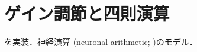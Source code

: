 \section{ゲイン調節と四則演算}\cite{Goldwyn2018-ug}を実装．神経演算 (neuronal arithmetic; \cite{Angus_Silver2010-fd})のモデル．